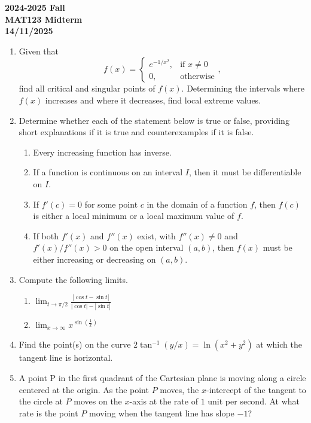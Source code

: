 \documentclass[a4paper, 12pt]{article}
\begin{document}
\pagestyle{empty}

\begin{center}
\textbf{2024-2025 Fall \\MAT123 Midterm\\14/11/2025}
\end{center}

\begin{enumerate}[leftmargin=*,label=\textbf{\arabic*.}]
\item Given that
\[
f(x) =
\begin{cases}
e^{-1/x^2}, & \text{if } x\neq0 \\[1em]
0, & \text{otherwise}
\end{cases},
\]
find all critical and singular points of $f(x)$. Determining the intervals where $f(x)$ increases and where it decreases, find local extreme values.

\item Determine whether each of the statement below is true or false, providing short explanations if it is true and counterexamples if it is false.

\begin{enumerate}[leftmargin=*,label=\textbf{\alph*.}]
\item Every increasing function has inverse.
\item If a function is continuous on an interval $I$, then it must be differentiable on $I$.
\item If $f'(c)=0$ for some point $c$ in the domain of a function $f$, then $f(c)$ is either a local minimum or a local maximum value of $f$.
\item If both $f'(x)$ and $f''(x)$ exist, with $f''(x)\neq0$ and $f'(x)/f''(x)>0$ on the open interval $(a,b)$, then $f(x)$ must be either increasing or decreasing on $(a,b)$.
\end{enumerate}

\item Compute the following limits.
\begin{enumerate}[leftmargin=*,label=\textbf{\alph*.}]
\item $\displaystyle\lim_{t\to\pi/2}\frac{\left|\cos t-\sin t\right|}{\left|\cos t\right|-\left|\sin t\right|}$
\item $\displaystyle\lim_{x\to\infty} x^{\sin\left(\frac1x\right)}$
\end{enumerate}

\item Find the point(s) on the curve $2\tan^{-1}(y/x)=\ln\left(x^2+y^2\right)$ at which the tangent line is horizontal.

\item A point P in the first quadrant of the Cartesian plane is moving along a circle centered at the origin. As the point $P$ moves, the $x$-intercept of the tangent to the circle at $P$ moves on the $x$-axis at the rate of $1$ unit per second. At what rate is the point $P$ moving when the tangent line has slope $-1$?
\end{enumerate}
\end{document}
